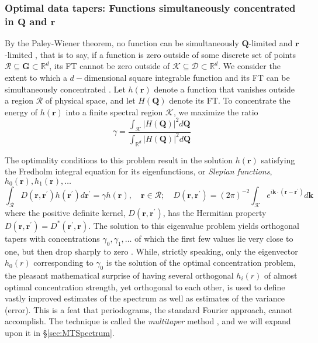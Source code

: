 \subsubsection{Optimal data tapers: Functions simultaneously concentrated in
$\mathbf{Q}$ and $\mathbf{r}$ \label{sec:Concentration}}

By the Paley-Wiener theorem, no function can be simultaneously $\mathbf{Q}$-limited
and $\mathbf{r}$-limited \cite{daubechies1992,hoganlakey}, that is to say, if a
function is zero outside of some discrete set of points $\mathcal{R} \subseteq
\mathbf{G} \subset \mathbb{R}^d$, its FT cannot be zero outside of $\mathcal{K}
\subseteq \mathcal{D} \subset \mathbb{R}^d$.  We consider the extent to which a
$d-$dimensional square integrable function and its FT can be simultaneously
concentrated \cite{PSWFI,PSWFV,slepian1964,simons2011}. Let $h(\mathbf{r})$ denote a
function that vanishes outside a region $\mathcal{R}$ of physical space, and let
$H(\mathbf{Q})$ denote its FT. To concentrate the energy of $h(\mathbf{r})$ into a
finite spectral region $\mathcal{K}$, we maximize the ratio
\begin{equation}
  \gamma = \frac{\int_{\mathcal{K}} |H(\mathbf{Q})|^2
  d\mathbf{Q}}{\int_{\mathbb{R}^d} |H(\mathbf{Q})|^2 d\mathbf{Q}}
\end{equation}

The optimality conditions to this problem result in the solution $h(\mathbf{r})$
satisfying the Fredholm integral equation \cite{brillinger1981} for its
eigenfunctions, or \emph{Slepian functions}, $h_0(\mathbf{r}), h_1(\mathbf{r}),
\ldots$ 
\begin{equation} \label{eq:Egval} 
  \int_{\mathcal{R}} D\left(\mathbf{r}, \mathbf{r}^{\prime}\right)
  h\left(\mathbf{r}^{\prime}\right) d \mathbf{r}^{\prime}=\gamma h(\mathbf{r}),
  \quad \mathbf{r} \in \mathcal{R}; \quad
  D\left(\mathbf{r}, \mathbf{r}^{\prime}\right)=(2 \pi)^{-2}
\int_{\mathcal{K}} e^{i \mathbf{k} \cdot\left(\mathbf{r}-\mathbf{r}^{\prime}\right)} d
\mathbf{k} 
\end{equation}
where the positive definite kernel, $D\left(\mathbf{r}, \mathbf{r}^{\prime}\right)$,
has the Hermitian property $D\left(\mathbf{r},
\mathbf{r}^{\prime}\right)=D^{*}\left(\mathbf{r}^{\prime}, \mathbf{r}\right)$.  The
solution to this eigenvalue problem yields orthogonal tapers with concentrations
$\gamma_0, \gamma_1, \ldots $ of which the first few values lie very close to one,
but then drop sharply to zero \cite{brillinger1981}. While, strictly speaking, only
the eigenvector $h_0(r)$ corresponding to $\gamma_0$ is the solution of the optimal
concentration problem, the pleasant mathematical surprise of having several
orthogonal $h_i(r)$ of almost optimal concentration strength, yet orthogonal to each
other, is used to define vastly improved estimates of the spectrum as well as
estimates of the variance (error). This is a feat that periodograms, the standard
Fourier approach, cannot accomplish. The technique is called the \textit{multitaper}
method \cite{t82}, and we will expand upon it in \S \ref{sec:MTSpectrum}.

